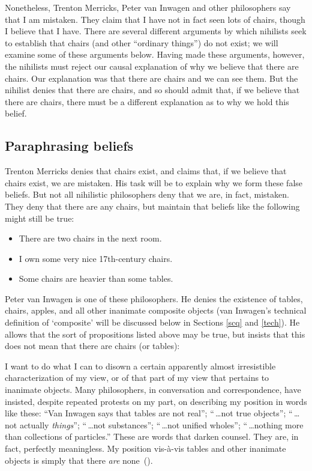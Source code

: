 \documentclass[12pt,twoside]{reedfancy}
\newenvironment{squote}{%
	\begin{spacing}{1}
	\begin{list}{}{%
	\setlength{\labelwidth}{0pt}%
	\rightmargin\leftmargin%
	}
	\item\relax
	}{%
	\end{list}%
	\end{spacing}
	}
\begin{document}
\begin{spacing}{1.25}
Nonetheless, Trenton Merricks, Peter van Inwagen and other
philosophers say that I am mistaken.  They claim that I have not in
fact seen lots of chairs, though I believe that I have.  There are
several different arguments by which nihilists seek to establish that
chairs (and other ``ordinary things'') do not exist; we will examine
some of these arguments below.  Having made these arguments, however,
the nihilists must reject our causal explanation of why we believe
that there are chairs.  Our explanation was that there are chairs and
we can see them.  But the nihilist denies that there are chairs, and
so should admit that, if we believe that there are chairs, there must
be a different explanation as to why we hold this belief.

\subsection{Paraphrasing beliefs}
\label{paraphrase}
Trenton Merricks denies that chairs exist, and claims that, if we
believe that chairs exist, we are mistaken.  His task will be to
explain why we form these false beliefs.  But not all nihilistic
philosophers deny that we are, in fact, mistaken.  They deny that
there are any chairs, but maintain that beliefs like the following
might still be true:

\begin{itemize}
  \item There are two chairs in the next room.
  \item I own some very nice 17th-century chairs.
  \item Some chairs are heavier than some tables.
\end{itemize}

Peter van Inwagen is one of these philosophers.  He denies the
existence of tables, chairs, apples, and all other inanimate composite
objects (van Inwagen's technical definition of `composite' will be
discussed below in Sections \ref{scq} and \ref{tech}).  He allows that
the sort of propositions listed above may be true, but insists that
this does not mean that there are chairs (or tables):
\begin{squote}
I want to do what I can to disown a certain apparently almost
irresistible characterization of my view, or of that part of my view
that pertains to inanimate objects.  Many philosophers, in
conversation and correspondence, have insisted, despite repeated
protests on my part, on describing my position in words like these:
``Van Inwagen says that tables are not real''; ``\,\ldots not true
objects''; ``\,\ldots not actually {\em things}''; ``\,\ldots not
substances''; ``\,\ldots not unified wholes''; ``\,\ldots nothing more
than collections of particles.''  These are words that darken counsel.
They are, in fact, perfectly meaningless.  My position vis-\`{a}-vis
tables and other inanimate objects is simply that there {\em are}
none~(\citeyear[99]{inwagen1995}).
\end{squote}


\end{spacing}
\end{document}
